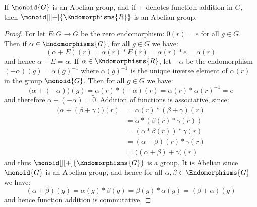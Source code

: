 \documentclass{article}                                                        %
\begin{document}
                \begin{theorem}
                    If $\monoid{G}$ is an Abelian group, and if $+$ denotes
                    function addition in $G$, then
                    $\monoid[][+]{\Endomorphisms{R}}$ is an Abelian group.
                \end{theorem}
                \begin{proof}
                    For let $E:G\rightarrow{G}$ be the zero
                    endomorphism: $\tilde{0}(r)=e$ for all $g\in{G}$. Then if
                    $\alpha\in\Endomorphisms{G}$, for all $g\in{G}$ we have:
                    \begin{equation}
                        (\alpha+E)(r)=\alpha(r)*E(r)=\alpha(r)*e=\alpha(r)
                    \end{equation}
                    and hence $\alpha+E=\alpha$. If
                    $\alpha\in\Endomorphisms{R}$, let $\minus{\alpha}$ be the
                    endomorphism $(\minus\alpha)(g)=\alpha(g)^{\minus{1}}$
                    where $\alpha(g)^{\minus{1}}$ is the unique inverse element
                    of $\alpha(r)$ in the group $\monoid{G}$. Then for all
                    $g\in{G}$ we have:
                    \begin{equation}
                        \big(\alpha+(\minus{\alpha})\big)(g)
                        =\alpha(r)*(\minus\alpha)(r)
                        =\alpha(r)*\alpha(r)^{\minus{1}}
                        =e
                    \end{equation}
                    and therefore $\alpha+(\minus{\alpha})=\tilde{0}$. Addition
                    of functions is associative, since:
                    \begin{subequations}
                        \begin{align}
                            \big(\alpha+(\beta+\gamma)\big)(r)
                            &=\alpha(r)*(\beta+\gamma)(r)\\
                            &=\alpha*(\beta(r)*\gamma(r))\\
                            &=(\alpha*\beta(r))*\gamma(r)\\
                            &=(\alpha+\beta)(r)*\gamma(r)\\
                            &=\big((\alpha+\beta)+\gamma\big)(r)
                        \end{align}
                    \end{subequations}
                    and thus $\monoid[][+]{\Endomorphisms{G}}$ is a group. It is
                    Abelian since $\monoid{G}$ is an Abelian group, and hence
                    for all $\alpha,\beta\in\Endomorphisms{G}$ we have:
                    \begin{equation}
                        (\alpha+\beta)(g)=\alpha(g)*\beta(g)
                            =\beta(g)*\alpha(g)
                            =(\beta+\alpha)(g)
                    \end{equation}
                    and hence function addition is commutative.
                \end{proof}
\end{document}
